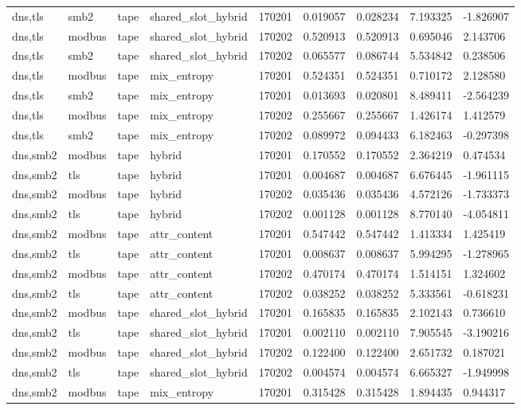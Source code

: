 \begin{tabular}{lllllllll}
dns,tls & smb2 & tape & shared\_slot\_hybrid & 170201 & 0.019057 & 0.028234 & 7.193325 & -1.826907 \\
dns,tls & modbus & tape & shared\_slot\_hybrid & 170202 & 0.520913 & 0.520913 & 0.695046 & 2.143706 \\
dns,tls & smb2 & tape & shared\_slot\_hybrid & 170202 & 0.065577 & 0.086744 & 5.534842 & 0.238506 \\
dns,tls & modbus & tape & mix\_entropy & 170201 & 0.524351 & 0.524351 & 0.710172 & 2.128580 \\
dns,tls & smb2 & tape & mix\_entropy & 170201 & 0.013693 & 0.020801 & 8.489411 & -2.564239 \\
dns,tls & modbus & tape & mix\_entropy & 170202 & 0.255667 & 0.255667 & 1.426174 & 1.412579 \\
dns,tls & smb2 & tape & mix\_entropy & 170202 & 0.089972 & 0.094433 & 6.182463 & -0.297398 \\
dns,smb2 & modbus & tape & hybrid & 170201 & 0.170552 & 0.170552 & 2.364219 & 0.474534 \\
dns,smb2 & tls & tape & hybrid & 170201 & 0.004687 & 0.004687 & 6.676445 & -1.961115 \\
dns,smb2 & modbus & tape & hybrid & 170202 & 0.035436 & 0.035436 & 4.572126 & -1.733373 \\
dns,smb2 & tls & tape & hybrid & 170202 & 0.001128 & 0.001128 & 8.770140 & -4.054811 \\
dns,smb2 & modbus & tape & attr\_content & 170201 & 0.547442 & 0.547442 & 1.413334 & 1.425419 \\
dns,smb2 & tls & tape & attr\_content & 170201 & 0.008637 & 0.008637 & 5.994295 & -1.278965 \\
dns,smb2 & modbus & tape & attr\_content & 170202 & 0.470174 & 0.470174 & 1.514151 & 1.324602 \\
dns,smb2 & tls & tape & attr\_content & 170202 & 0.038252 & 0.038252 & 5.333561 & -0.618231 \\
dns,smb2 & modbus & tape & shared\_slot\_hybrid & 170201 & 0.165835 & 0.165835 & 2.102143 & 0.736610 \\
dns,smb2 & tls & tape & shared\_slot\_hybrid & 170201 & 0.002110 & 0.002110 & 7.905545 & -3.190216 \\
dns,smb2 & modbus & tape & shared\_slot\_hybrid & 170202 & 0.122400 & 0.122400 & 2.651732 & 0.187021 \\
dns,smb2 & tls & tape & shared\_slot\_hybrid & 170202 & 0.004574 & 0.004574 & 6.665327 & -1.949998 \\
dns,smb2 & modbus & tape & mix\_entropy & 170201 & 0.315428 & 0.315428 & 1.894435 & 0.944317 \\

\end{tabular}
